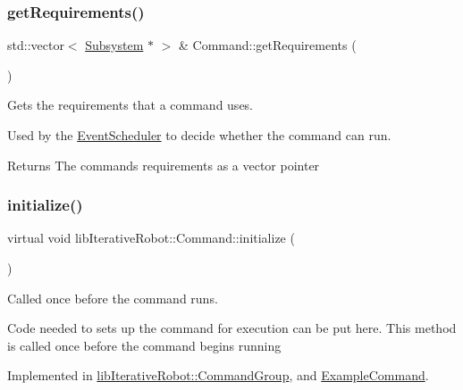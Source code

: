 \subsubsection{\texorpdfstring{getRequirements()}{getRequirements()}}
{\footnotesize\ttfamily std\+::vector$<$ \mbox{\hyperlink{classlib_iterative_robot_1_1_subsystem}{Subsystem}} $\ast$ $>$ \& Command\+::get\+Requirements (\begin{DoxyParamCaption}{ }\end{DoxyParamCaption})\hspace{0.3cm}{\ttfamily [protected]}}



Gets the requirements that a command uses. 

Used by the \mbox{\hyperlink{classlib_iterative_robot_1_1_event_scheduler}{Event\+Scheduler}} to decide whether the command can run. \begin{DoxyReturn}{Returns}
The command\textquotesingle{}s requirements as a vector pointer 
\end{DoxyReturn}
\mbox{\label{classlib_iterative_robot_1_1_command_a14543c9d38b07e52f9ffb2af88a63f60}} 
\subsubsection{\texorpdfstring{initialize()}{initialize()}}
{\footnotesize\ttfamily virtual void lib\+Iterative\+Robot\+::\+Command\+::initialize (\begin{DoxyParamCaption}{ }\end{DoxyParamCaption})\hspace{0.3cm}{\ttfamily [pure virtual]}}



Called once before the command runs. 

Code needed to sets up the command for execution can be put here. This method is called once before the command begins running 

Implemented in \mbox{\hyperlink{classlib_iterative_robot_1_1_command_group_a99800c5dbd05ab750aa0bb27518d0467}{lib\+Iterative\+Robot\+::\+Command\+Group}}, and \mbox{\hyperlink{class_example_command_ae7bea17127c1697acbf90d6022eb5b5d}{Example\+Command}}.

\mbox{\label{classlib_iterative_robot_1_1_command_a8e4dccdd88f432a716090f532ba097f7}} 

